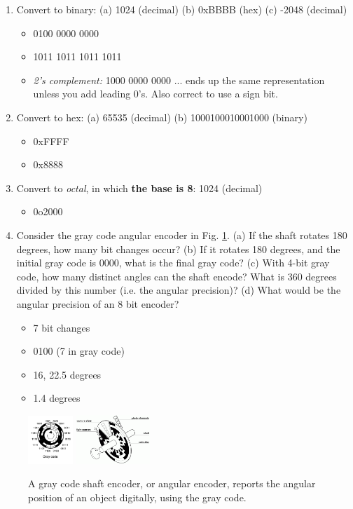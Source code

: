 \documentclass[10pt]{article}
\begin{document}
\begin{enumerate}
\item Convert to binary: (a) 1024 (decimal) (b) 0xBBBB (hex) (c) -2048 (decimal)
\begin{itemize}
\item 0100 0000 0000
\item 1011 1011 1011 1011
\item \textit{2's complement:} 1000 0000 0000 ... ends up the same representation unless you add leading 0's.  Also correct to use a sign bit.
\end{itemize}
\item Convert to hex: (a) 65535 (decimal) (b) 1000100010001000 (binary)
\begin{itemize}
\item 0xFFFF
\item 0x8888
\end{itemize}
\item Convert to \textit{octal}, in which \textbf{the base is 8}: 1024 (decimal)
\begin{itemize}
\item 0o2000
\end{itemize}
\item Consider the gray code angular encoder in Fig. \ref{fig:grayCode}.  (a) If the shaft rotates 180 degrees, how many bit changes occur?  (b) If it rotates 180 degrees, and the initial gray code is 0000, what is the final gray code?  (c) With 4-bit gray code, how many distinct angles can the shaft encode?  What is 360 degrees divided by this number (i.e. the angular precision)? (d) What would be the angular precision of an 8 bit encoder?
\begin{itemize}
\item 7 bit changes
\item 0100 (7 in gray code)
\item 16, 22.5 degrees
\item 1.4 degrees
\end{itemize}
\end{enumerate}
\begin{figure}[hb]
\centering
\includegraphics[width=0.15\textwidth]{grayCode1.png}
\includegraphics[width=0.25\textwidth]{grayCode2.png}
\caption{\label{fig:grayCode} A gray code shaft encoder, or angular encoder, reports the angular position of an object digitally, using the gray code.}
\end{figure}
\end{document}
